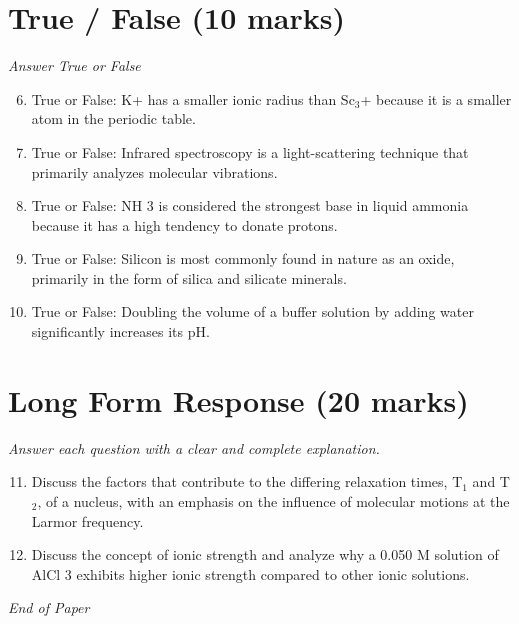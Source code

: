 \documentclass[12pt]{article}
\begin{document}
\section*{True / False (10 marks)}
\textit{Answer True or False}
\begin{enumerate}[label=\arabic*.]
\setcounter{enumi}{5}
\item True or False: K+ has a smaller ionic radius than Sc$_{3}$+ because it is a smaller atom in the periodic table.
\item True or False: Infrared spectroscopy is a light-scattering technique that primarily analyzes molecular vibrations.
\item True or False: NH 3 is considered the strongest base in liquid ammonia because it has a high tendency to donate protons.
\item True or False: Silicon is most commonly found in nature as an oxide, primarily in the form of silica and silicate minerals.
\item True or False: Doubling the volume of a buffer solution by adding water significantly increases its pH.
\end{enumerate}

\section*{Long Form Response (20 marks)}
\textit{Answer each question with a clear and complete explanation.}
\begin{enumerate}[label=\arabic*.]
\setcounter{enumi}{10}
\item Discuss the factors that contribute to the differing relaxation times, T$_{1}$ and T$_{2}$, of a nucleus, with an emphasis on the influence of molecular motions at the Larmor frequency.
\item Discuss the concept of ionic strength and analyze why a 0.050 M solution of AlCl 3 exhibits higher ionic strength compared to other ionic solutions.
\end{enumerate}

\vfill
\noindent\textit{End of Paper}
\end{document}
